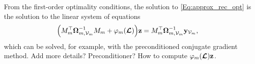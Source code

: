 \documentclass[journal, 10pt]{IEEEtran}
\begin{document}
From the first-order optimality conditions, the solution to \eqref{Eq:approx_rec_opt} is the solution to the linear system of equations
\begin{align}\label{Eq:approx_rec_sol}
\Bigl(M_m^{\top}{\boldsymbol \Omega}_{m,\V_m}^{-1}M_m+\varphi_m(\L)\Bigr){\bf  z}=M_m^{\top}{\boldsymbol \Omega}_{m,\V_m}^{-1}{\bf y}_{\V_m},
\end{align}
which can be solved, for example, with the preconditioned conjugate gradient method. {\color{red}Add more details? Preconditioner? How to compute $\varphi_m(\boldsymbol{\mathcal{L}}){\bf z}$.}


\end{document}
